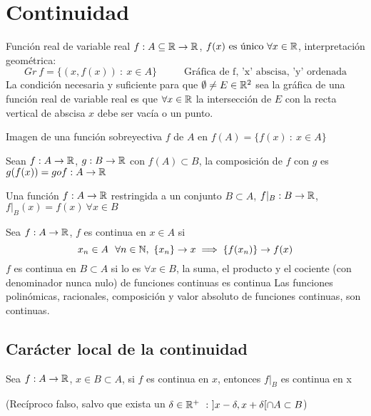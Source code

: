 \section{Continuidad}
Función real de variable real $f:A\subseteq\mathbb{R}\rightarrow\mathbb{R}$, $f(x) \text{ es único } \forall x\in\mathbb{R}$, interpretación geométrica:
$$ Gr \ f = \{(x,f(x)) \ : \ x\in A\} \hspace{1cm} \text{ Gráfica de f, 'x' abscisa, 'y' ordenada}$$
La condición necesaria y suficiente para que $\emptyset\not =E\in\mathbb{R}^2$ sea la gráfica de una función real de variable real es que $\forall x\in\mathbb{R}$ la intersección de $E$ con la recta vertical de abscisa $x$ debe ser vacía o un punto.

Imagen de una función sobreyectiva $f$  de $A$ en $f(A) = \{f(x) \ : \ x\in A\} $

Sean $f:A\rightarrow\mathbb{R}$, $g:B\rightarrow\mathbb{R}$ con $f(A)\subset B$, la composición de $f$ con $g$ es $g(f(x)) = gof:A\rightarrow\mathbb{R}$

Una función $f:A\rightarrow\mathbb{R}$ restringida a un conjunto $B\subset A$, $f|_B : B\rightarrow \mathbb{R}$, 
$f|_B (x) = f(x) \ \forall x\in B$

Sea $f:A\rightarrow\mathbb{R}$, $f$ es continua en $x\in A$ si
$$ x_n\in A \ \ \forall n\in\N,\ \{x_n\}\rightarrow x \implies \{f(x_n)\}\rightarrow f(x) $$
$f$ es continua en $B\subset A$ si lo es $\forall x\in B$, la suma, el producto y el cociente (con denominador nunca nulo) de funciones continuas es continua
Las funciones polinómicas, racionales, composición y valor absoluto de funciones continuas, son continuas.

\subsection{Carácter local de la continuidad}
Sea $f:A\rightarrow\mathbb{R}$, $x\in B\subset A$, si $f$ es continua en $x$, entonces $f|_B$ es continua en x 

(Recíproco falso, salvo que exista un $\delta\in\mathbb{R}^+ \ : \ ]x-\delta,x+\delta[\cap A \subset B$)